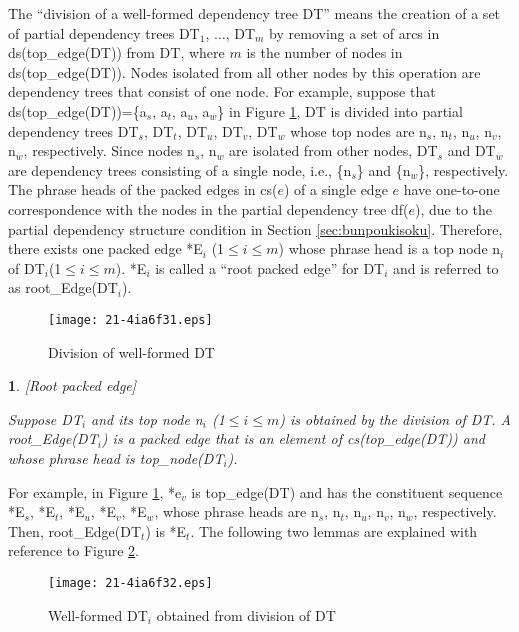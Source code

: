 \documentclass[english]{jnlp_1.4_rep}
\theoremstyle{break}
\theoremstyle{plain}
\theoremstyle{plain}
\newtheorem{definition}{}
\begin{document}
The ``division of a well-formed dependency tree DT'' means the
creation of a set of partial dependency trees DT$_1$, ${\ldots}$, DT$_m$
by removing a set of arcs in ds(top\_edge(DT)) from DT, where $m$ is the
number of nodes in ds(top\_edge(DT)). Nodes isolated from all other
nodes by this operation are dependency trees that consist of one
node. For example, suppose that
ds(top\_edge(DT))=\{a$_s$, a$_t$, a$_u$, a$_w$\} in
Figure \ref{fig:DTGraphDivision}, DT is divided into partial dependency
trees DT$_s$, DT$_t$, DT$_u$, DT$_v$, DT$_w$ whose top nodes are
n$_s$, n$_t$, n$_u$, n$_v$, n$_w$, respectively. Since nodes n$_s$, n$_w$
are isolated from other nodes, DT$_s$ and DT$_w$ are dependency trees
consisting of a single node, i.e., \{n$_s$\} and \{n$_w$\},
respectively. The phrase heads of the packed edges in cs($e$) of a
single edge $e$ have one-to-one correspondence with the nodes in the
partial dependency tree df($e$), due to the partial dependency
structure condition in Section \ref{sec:bunpoukisoku}. Therefore,
there exists one packed edge *E$_i$ (1${\leq}i{\leq}m$) whose phrase
head is a top node n$_i$ of DT$_i$(1${\leq}i{\leq}m$). *E$_i$ is
called a ``root packed edge'' for DT$_i$ and is referred to as
root\_Edge(DT$_i$).

\begin{figure}[b]
 \begin{center}
\texttt{[image: 21-4ia6f31.eps]}
 \end{center}
\caption{Division of well-formed DT}
\label{fig:DTGraphDivision}
\end{figure}

\begin{definition}\label{def:RootPackedEdge}[Root packed edge] 

Suppose DT$_i$ and its top node n$_i$ (1${\leq}i{\leq}m$) is obtained
by the division of DT. A root\_Edge(DT$_i$) is a packed edge that is
an element of cs(top\_edge(DT)) and whose phrase head is
top\_node(DT$_i$).
\end{definition}

For example, in Figure \ref{fig:DTGraphDivision}, *e$_v$ is top\_edge(DT)
and has the constituent sequence *E$_s$, *E$_t$, *E$_u$, *E$_v$, *E$_w$,
whose phrase heads are n$_s$, n$_t$, n$_u$, n$_v$, n$_w$,
respectively. Then, root\_Edge(DT$_t$) is *E$_t$. The following two
lemmas are explained with reference to
Figure \ref{fig:DTiObtainedFromDT}.

\begin{figure}[b]
\begin{center}
\texttt{[image: 21-4ia6f32.eps]}
 \end{center}
\caption{Well-formed DT$_i$ obtained from division of DT}
\label{fig:DTiObtainedFromDT}
\end{figure}
\end{document}
